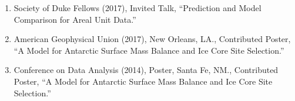 \documentclass[11pt]{article}
\begin{document}
\begin{enumerate}[label=$\bullet$]
\item Society of Duke Fellows (2017), Invited Talk, ``Prediction and Model Comparison for Areal Unit Data.''
\item American Geophysical Union (2017), New Orleans, LA., Contributed Poster, ``A Model for Antarctic Surface Mass Balance and Ice Core Site Selection.'' 

\item Conference on Data Analysis (2014), Poster, Santa Fe, NM., Contributed Poster, ``A Model for Antarctic Surface Mass Balance and Ice Core Site Selection.'' 



\end{enumerate}
\end{document}
